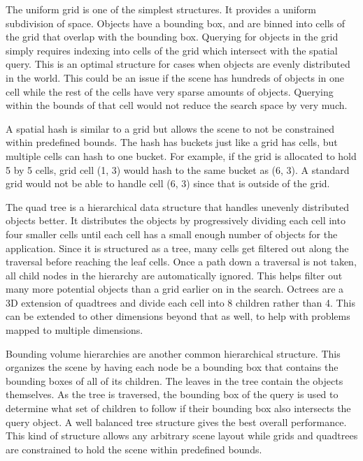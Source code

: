\documentclass[12pt]{ucthesis}
\begin{document}
The uniform grid is one of the simplest structures.
It provides a uniform subdivision of space.
Objects have a bounding box, and are binned into cells of the grid that overlap with the bounding box.\cite{culling-bf, applications-spatial, chess}
Querying for objects in the grid simply requires indexing into cells of the grid which intersect with the spatial query.
This is an optimal structure for cases when objects are evenly distributed in the world.
This could be an issue if the scene has hundreds of objects in one cell while the rest of the cells have very sparse amounts of objects.
Querying within the bounds of that cell would not reduce the search space by very much.

A spatial hash is similar to a grid but allows the scene to not be constrained within predefined bounds.
The hash has buckets just like a grid has cells, but multiple cells can hash to one bucket.
For example, if the grid is allocated to hold 5 by 5 cells, grid cell (1, 3) would hash to the same bucket as (6, 3).
A standard grid would not be able to handle cell (6, 3) since that is outside of the grid.

The quad tree is a hierarchical data structure that handles unevenly distributed objects better.\cite{applications-spatial}
It distributes the objects by progressively dividing each cell into four smaller cells until each cell has a small enough number of objects for the application.
Since it is structured as a tree, many cells get filtered out along the traversal before reaching the leaf cells.
Once a path down a traversal is not taken, all child nodes in the hierarchy are automatically ignored.
This helps filter out many more potential objects than a grid earlier on in the search.
Octrees are a 3D extension of quadtrees and divide each cell into 8 children rather than 4.
This can be extended to other dimensions beyond that as well, to help with problems mapped to multiple dimensions.\cite{applications-spatial}

Bounding volume hierarchies are another common hierarchical structure.\cite{BVH}
This organizes the scene by having each node be a bounding box that contains the bounding boxes of all of its children.
The leaves in the tree contain the objects themselves.
As the tree is traversed, the bounding box of the query is used to determine what set of children to follow if their bounding box also intersects the query object.
A well balanced tree structure gives the best overall performance.
This kind of structure allows any arbitrary scene layout while grids and quadtrees are constrained to hold the scene within predefined bounds.
\end{document}
